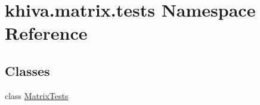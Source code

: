 \hypertarget{namespacekhiva_1_1matrix_1_1tests}{}\section{khiva.\+matrix.\+tests Namespace Reference}
\label{namespacekhiva_1_1matrix_1_1tests}
\subsection*{Classes}
\begin{DoxyCompactItemize}
\item 
class \mbox{\hyperlink{classkhiva_1_1matrix_1_1tests_1_1_matrix_tests}{Matrix\+Tests}}
\end{DoxyCompactItemize}
